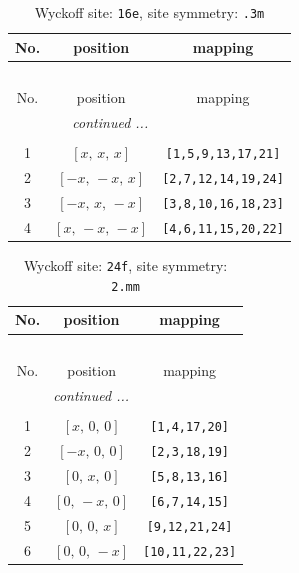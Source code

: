 \documentclass[fleqn,8pt]{jsarticle}
\begin{document}
\begin{longtable}{ccc}
\caption{Wyckoff site: {\tt 16e}, site symmetry: {\tt .3m}}
 \\
 \hline \hline
No. & position & mapping \\ \hline \endfirsthead

\multicolumn{2}{l}{\tablename\ \thetable{}} \\
 \hline \hline
No. & position & mapping \\ \hline \endhead

 \hline \hline
\multicolumn{2}{r}{\footnotesize\it continued ...} \\ \endfoot

 \hline \hline
\multicolumn{2}{r}{} \\ \endlastfoot

1 & $\left[ x,\, x,\, x \right]$ & {\tt [1,5,9,13,17,21]} \\ \hline
2 & $\left[ - x,\, - x,\, x \right]$ & {\tt [2,7,12,14,19,24]} \\ \hline
3 & $\left[ - x,\, x,\, - x \right]$ & {\tt [3,8,10,16,18,23]} \\ \hline
4 & $\left[ x,\, - x,\, - x \right]$ & {\tt [4,6,11,15,20,22]} \\
\end{longtable}
\renewcommand{\arraystretch}{1.2}
\begin{longtable}{ccc}
\caption{Wyckoff site: {\tt 24f}, site symmetry: {\tt 2.mm}}
 \\
 \hline \hline
No. & position & mapping \\ \hline \endfirsthead

\multicolumn{2}{l}{\tablename\ \thetable{}} \\
 \hline \hline
No. & position & mapping \\ \hline \endhead

 \hline \hline
\multicolumn{2}{r}{\footnotesize\it continued ...} \\ \endfoot

 \hline \hline
\multicolumn{2}{r}{} \\ \endlastfoot

1 & $\left[ x,\, 0,\, 0 \right]$ & {\tt [1,4,17,20]} \\ \hline
2 & $\left[ - x,\, 0,\, 0 \right]$ & {\tt [2,3,18,19]} \\ \hline
3 & $\left[ 0,\, x,\, 0 \right]$ & {\tt [5,8,13,16]} \\ \hline
4 & $\left[ 0,\, - x,\, 0 \right]$ & {\tt [6,7,14,15]} \\ \hline
5 & $\left[ 0,\, 0,\, x \right]$ & {\tt [9,12,21,24]} \\ \hline
6 & $\left[ 0,\, 0,\, - x \right]$ & {\tt [10,11,22,23]} \\
\end{longtable}
\end{document}
